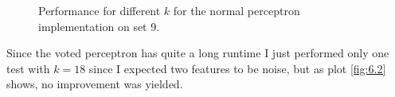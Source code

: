 \documentclass[12pt]{article}
\begin{document}
\begin{figure}[H]
	\centering
	\hfill
	\hfill
	\hfill
	\caption[]{Performance for different $k$ for the normal perceptron implementation on set 9.}
	\label{fig:6.1}
\end{figure}

Since the voted perceptron has quite a long runtime I just performed only one test with $k=18$ since I expected two features to be noise, but as plot \ref{fig:6.2} shows, no improvement was yielded.
\end{document}
